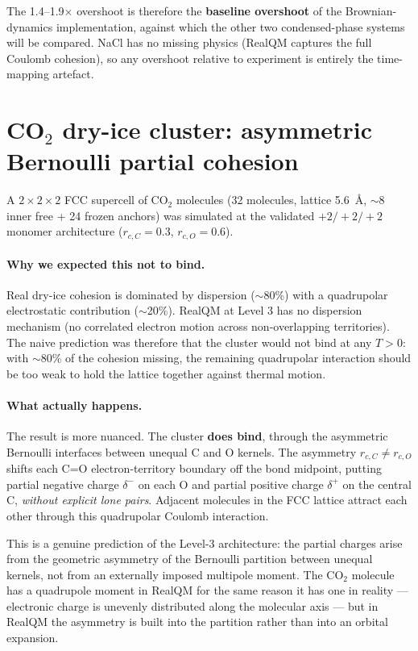 The 1.4--1.9$\times$ overshoot is therefore the \textbf{baseline overshoot} of the Brownian-dynamics implementation, against which the other two condensed-phase systems will be compared. NaCl has no missing physics (RealQM captures the full Coulomb cohesion), so any overshoot relative to experiment is entirely the time-mapping artefact.

\section{CO$_2$ dry-ice cluster: asymmetric Bernoulli partial cohesion}\label{sec:co2}

A $2 \times 2 \times 2$ FCC supercell of CO$_2$ molecules (32 molecules, lattice 5.6~\AA, $\sim$8 inner free + 24 frozen anchors) was simulated at the validated $+2/+2/+2$ monomer architecture ($r_{c,C} = 0.3$, $r_{c,O} = 0.6$).

\paragraph{Why we expected this not to bind.}
Real dry-ice cohesion is dominated by dispersion ($\sim$80\%) with a quadrupolar electrostatic contribution ($\sim$20\%). RealQM at Level 3 has no dispersion mechanism (no correlated electron motion across non-overlapping territories). The naive prediction was therefore that the cluster would not bind at any $T > 0$: with $\sim$80\% of the cohesion missing, the remaining quadrupolar interaction should be too weak to hold the lattice together against thermal motion.

\paragraph{What actually happens.}
The result is more nuanced. The cluster \textbf{does bind}, through the asymmetric Bernoulli interfaces between unequal C and O kernels. The asymmetry $r_{c,C} \ne r_{c,O}$ shifts each C=O electron-territory boundary off the bond midpoint, putting partial negative charge $\delta^-$ on each O and partial positive charge $\delta^+$ on the central C, \emph{without explicit lone pairs}. Adjacent molecules in the FCC lattice attract each other through this quadrupolar Coulomb interaction.

This is a genuine prediction of the Level-3 architecture: the partial charges arise from the geometric asymmetry of the Bernoulli partition between unequal kernels, not from an externally imposed multipole moment. The CO$_2$ molecule has a quadrupole moment in RealQM for the same reason it has one in reality --- electronic charge is unevenly distributed along the molecular axis --- but in RealQM the asymmetry is built into the partition rather than into an orbital expansion.

